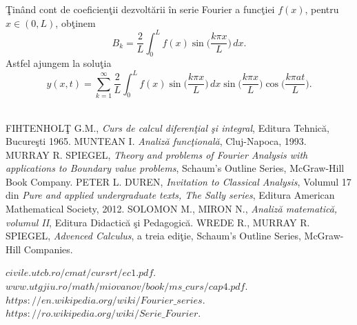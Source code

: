 \documentclass[a4paper,openany,12pt]{report}
\begin{document}
\c Tin\^ and cont de coeficien\c tii dezvolt\u arii \^ in serie Fourier a func\c tiei $f(x)$, pentru $x\in (0,L)$, ob\c tinem
\begin{equation*}
B_k=\frac{2}{L}\int_0^L f(x)\sin\Big(\frac{k\pi x}{L}\Big)\, dx.
\end{equation*}
Astfel ajungem la solu\c tia
\begin{equation*}
y(x,t)=\sum_{k=1}^\infty \frac{2}{L}\int_0^L f(x)\sin\Big(\frac{k\pi x}{L}\Big)\, dx\sin\Big(\frac{k\pi x}{L}\Big)\cos\Big(\frac{k \pi a t}{L}\Big).
\end{equation*}







\begin{thebibliography}\\
\bibitem{}FIHTENHOL\c T G.M., \textit{Curs de calcul diferen\c tial \c si integral}, Editura Tehnic\u a, Bucure\c sti 1965.
\bibitem{}MUNTEAN I. \textit{Analiz\u a func\c tional\u a}, Cluj-Napoca, 1993.
\bibitem{}MURRAY R. SPIEGEL, \textit{Theory and problems of Fourier Analysis with applications to Boundary value problems}, Schaum's Outline Series, McGraw-Hill Book Company.
\bibitem{}PETER L. DUREN, \textit{Invitation to Classical Analysis}, Volumul 17 din \textit{Pure and applied undergraduate texts, The Sally series}, Editura American Mathematical Society, 2012.
\bibitem{}SOLOMON M., MIRON N., \textit{Analiz\u a matematic\u a, volumul II}, Editura Didactic\u a \c si Pedagogic\u a.
\bibitem{}WREDE R., MURRAY R. SPIEGEL, \textit{Advenced Calculus}, a treia edi\c tie, Schaum's Outline Series, McGraw-Hill Companies.

\bibitem{}$civile.utcb.ro/cmat/cursrt/ec1.pdf$.
\bibitem{}$www.utgjiu.ro/math/miovanov/book/ms\_curs/cap4.pdf$.
\bibitem{}$https://en.wikipedia.org/wiki/Fourier\_series$.
\bibitem{}$https://ro.wikipedia.org/wiki/Serie\_Fourier$.
\end{thebibliography}
\end{document}
